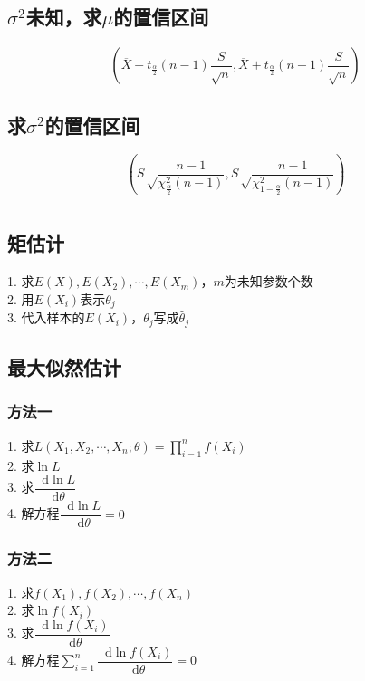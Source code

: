 \documentclass[]{article}
\newcommand*{\dif}{\mathop{}\!\mathrm{d}}
\numberwithin{equation}{section}
\begin{document}
\subsection{$\sigma^2$未知，求$\mu$的置信区间}
\begin{equation}
    (\overline{X}-t_\frac{\alpha}{2}(n-1)\frac{S}{\sqrt n},\overline{X}+t_\frac{\alpha}{2}(n-1)\frac{S}{\sqrt n})
\end{equation}
\subsection{求$\sigma^2$的置信区间}
\begin{equation}
    (S\sqrt\frac{n-1}{\chi^2_{\frac{\alpha}{2}}(n-1)},S\sqrt\frac{n-1}{\chi^2_{1-\frac{\alpha}{2}}(n-1)})
\end{equation}

\section{}
\subsection{矩估计}
\begin{center}
    1. 求$E(X),E(X_2),\cdots,E(X_m)$，$m$为未知参数个数\\
    2. 用$E(X_i)$表示$\theta_j$\\
    3. 代入样本的$E(X_i)$，$\theta_j$写成$\hat{\theta}_j$
\end{center}
\subsection{最大似然估计}
\subsubsection{方法一}
\begin{center}
    1. 求$L(X_1,X_2,\cdots,X_n;\theta)=\prod\limits_{i=1}^nf(X_i)$\\
    2. 求$\ln L$\\
    3. 求$\dfrac{\dif \ln L}{\dif\theta}$\\
    4. 解方程$\dfrac{\dif \ln L}{\dif\theta}=0$

\end{center}
\subsubsection{方法二}
\begin{center}
    1. 求$f(X_1),f(X_2),\cdots,f(X_n)$\\
    2. 求$\ln f(X_i)$\\
    3. 求$\dfrac{\dif \ln f(X_i)}{\dif\theta}$\\
    4. 解方程$\sum\limits_{i=1}^n\dfrac{\dif \ln f(X_i)}{\dif\theta}=0$
\end{center}
\end{document}
